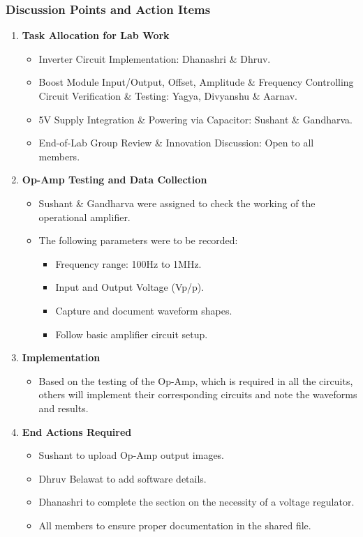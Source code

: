 \documentclass[12pt,a4paper]{article}
\begin{document}
\subsubsection*{Discussion Points and Action Items}
\begin{enumerate}
    \item \textbf{Task Allocation for Lab Work}
    \begin{itemize}
        \item Inverter Circuit Implementation: Dhanashri \& Dhruv.
        \item Boost Module Input/Output, Offset, Amplitude \& Frequency Controlling Circuit Verification \& Testing: Yagya, Divyanshu \& Aarnav.
        \item 5V Supply Integration \& Powering via Capacitor: Sushant \& Gandharva.
        \item End-of-Lab Group Review \& Innovation Discussion: Open to all members.
    \end{itemize}
    
    \item \textbf{Op-Amp Testing and Data Collection}
    \begin{itemize}
        \item Sushant \& Gandharva were assigned to check the working of the operational amplifier.
        \item The following parameters were to be recorded:
        \begin{itemize}
            \item Frequency range: 100Hz to 1MHz.
            \item Input and Output Voltage (Vp/p).
            \item Capture and document waveform shapes.
            \item Follow basic amplifier circuit setup.
        \end{itemize}
    \end{itemize}
    
    \item \textbf{Implementation}
    \begin{itemize}
        \item Based on the testing of the Op-Amp, which is required in all the circuits, others will implement their corresponding circuits and note the waveforms and results.
    \end{itemize}
    
    \item \textbf{End Actions Required}
    \begin{itemize}
        \item Sushant to upload Op-Amp output images.
        \item Dhruv Belawat to add software details.
        \item Dhanashri to complete the section on the necessity of a voltage regulator.
        \item All members to ensure proper documentation in the shared file.
    \end{itemize}
\end{enumerate}
\end{document}
